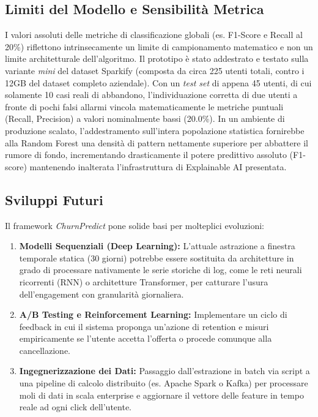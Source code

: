 \documentclass[11pt,a4paper]{article}
\begin{document}
\subsection{Limiti del Modello e Sensibilità Metrica}
I valori assoluti delle metriche di classificazione globali (es. F1-Score e Recall al 20\%) riflettono intrinsecamente un limite di campionamento matematico e non un limite architetturale dell'algoritmo. Il prototipo è stato addestrato e testato sulla variante \textit{mini} del dataset Sparkify (composta da circa 225 utenti totali, contro i 12GB del dataset completo aziendale). Con un \textit{test set} di appena 45 utenti, di cui solamente 10 casi reali di abbandono, l'individuazione corretta di due utenti a fronte di pochi falsi allarmi vincola matematicamente le metriche puntuali (Recall, Precision) a valori nominalmente bassi (20.0\%). In un ambiente di produzione scalato, l'addestramento sull'intera popolazione statistica fornirebbe alla Random Forest una densità di pattern nettamente superiore per abbattere il rumore di fondo, incrementando drasticamente il potere predittivo assoluto (F1-score) mantenendo inalterata l'infrastruttura di Explainable AI presentata.

\subsection{Sviluppi Futuri}
Il framework \textit{ChurnPredict} pone solide basi per molteplici evoluzioni:
\begin{enumerate}
    \item \textbf{Modelli Sequenziali (Deep Learning):} L'attuale astrazione a finestra temporale statica (30 giorni) potrebbe essere sostituita da architetture in grado di processare nativamente le serie storiche di log, come le reti neurali ricorrenti (RNN) o architetture Transformer, per catturare l'usura dell'engagement con granularità giornaliera.
    \item \textbf{A/B Testing e Reinforcement Learning:} Implementare un ciclo di feedback in cui il sistema proponga un'azione di retention e misuri empiricamente se l'utente accetta l'offerta o procede comunque alla cancellazione.
    \item \textbf{Ingegnerizzazione dei Dati:} Passaggio dall'estrazione in batch via script a una pipeline di calcolo distribuito (es. Apache Spark o Kafka) per processare moli di dati in scala enterprise e aggiornare il vettore delle feature in tempo reale ad ogni click dell'utente.
\end{enumerate}
\end{document}
